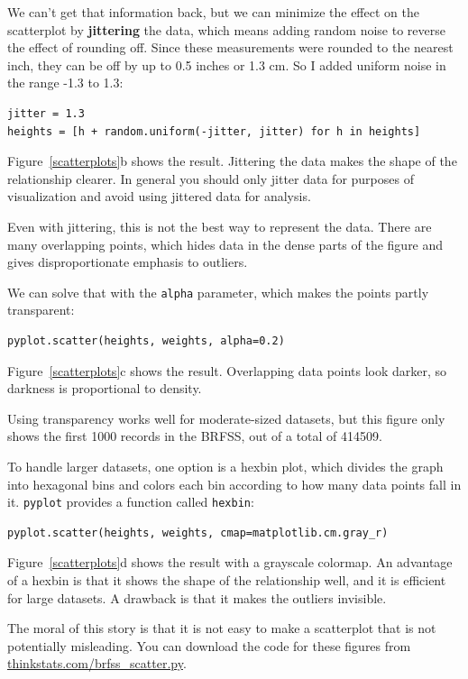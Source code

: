 \documentclass[12pt]{book}
\begin{document}
We can't get that information back, but we can minimize the effect on
the scatterplot by {\bf jittering} the data, which means adding random
noise to reverse the effect of rounding off.  Since these measurements
were rounded to the nearest inch, they can be off by up to 0.5 inches or
1.3 cm.  So I added uniform noise in the range -1.3 to 1.3:

\begin{verbatim}
jitter = 1.3
heights = [h + random.uniform(-jitter, jitter) for h in heights]
\end{verbatim}

Figure~\ref{scatterplots}b shows the result.  Jittering the data makes
the shape of the relationship clearer.  In general you should only jitter
data for purposes of visualization and avoid using jittered data
for analysis.

Even with jittering, this is not the best way to represent the data.
There are many overlapping points, which hides data
in the dense parts of the figure and gives disproportionate emphasis
to outliers.

We can solve that with the {\tt alpha} parameter, which makes
the points partly transparent:
%
\begin{verbatim}
pyplot.scatter(heights, weights, alpha=0.2)
\end{verbatim}
%
Figure~\ref{scatterplots}c shows the result.  Overlapping data points
look darker, so darkness is proportional to density.

Using transparency works well for moderate-sized datasets, but this
figure only shows the first 1000 records in the BRFSS, out of a total
of 414509.

To handle larger datasets, one option is a hexbin plot, which divides
the graph into hexagonal bins and colors each bin according to how many
data points fall in it.  {\tt pyplot} provides a function called 
{\tt hexbin}:
%
\begin{verbatim}
pyplot.scatter(heights, weights, cmap=matplotlib.cm.gray_r)
\end{verbatim}
%
Figure~\ref{scatterplots}d shows the result with a grayscale colormap.
An advantage of a hexbin is that it shows the shape of the relationship
well, and it is efficient for large datasets.  A drawback is that
it makes the outliers invisible.

The moral of this story is that it is
not easy to make a scatterplot that is not potentially misleading.
You can download the code for these figures from
\url{thinkstats.com/brfss_scatter.py}.
\end{document}
